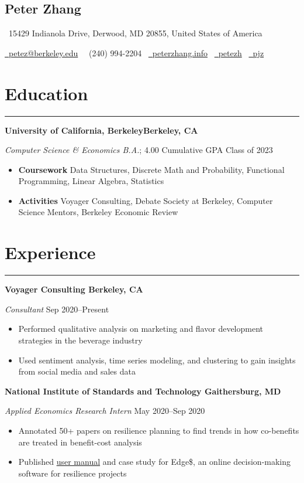 \documentclass[11pt]{article}
\newcommand{\name}[1]{\begin{center}\section*{\huge \color{highlight} #1}\end{center}}
\newcommand{\topinfo}[1]{\begin{center}\vspace{-0.2cm}#1\vspace{-0.2cm}\end{center}}
\newcommand{\resumesection}[1]{\vspace{-0.3cm}\section*{\color{highlight}#1}\vspace{-0.3cm}\hrule\vspace{0.3cm}}
\begin{document}
\name{Peter Zhang}
\topinfo{\faHome \ 15429 Indianola Drive, Derwood, MD 20855, United States of America}
\topinfo{\href{mailto:petez@berkeley.edu}{\faEnvelope \ petez@berkeley.edu} \ \faPhone \ (240) 994-2204 \ \href{https://peterzhang.info/}{\faBriefcase \ peterzhang.info} \  \href{https://github.com/petezh}{\faGithub \ petezh} \  \href{https://www.linkedin.com/in/pjz/}{\faLinkedinSquare \ pjz}}

\resumesection{Education}

\textbf{University of California, Berkeley\hfill Berkeley, CA} \par
\textit{Computer Science \& Economics B.A.}; 4.00 Cumulative GPA \hfill Class of 2023
\begin{itemize}
	\item \textbf{Coursework} Data Structures, Discrete Math and Probability, Functional Programming, Linear Algebra, Statistics
	\item \textbf{Activities} Voyager Consulting, Debate Society at Berkeley, Computer Science Mentors, Berkeley Economic Review
\end{itemize}

\resumesection{Experience}

\textbf{Voyager Consulting \hfill Berkeley, CA}\par
\textit{Consultant} \hfill Sep 2020--Present
\begin{itemize}
	\item Performed qualitative analysis on marketing and flavor development strategies in the beverage industry
	\item Used sentiment analysis, time series modeling, and clustering to gain insights from social media and sales data
\end{itemize}\par

\textbf{National Institute of Standards and Technology \hfill Gaithersburg, MD}\par

\textit{Applied Economics Research Intern} \hfill May 2020--Sep 2020
\begin{itemize}
	\item Annotated 50+ papers on resilience planning to find trends in how co-benefits are treated in benefit-cost analysis
	\item Published \href{https://nvlpubs.nist.gov/nistpubs/SpecialPublications/NIST.SP.1260.pdf}{user manual} and case study for Edge\$, an online decision-making software for resilience projects
\end{itemize}\par
\end{document}
